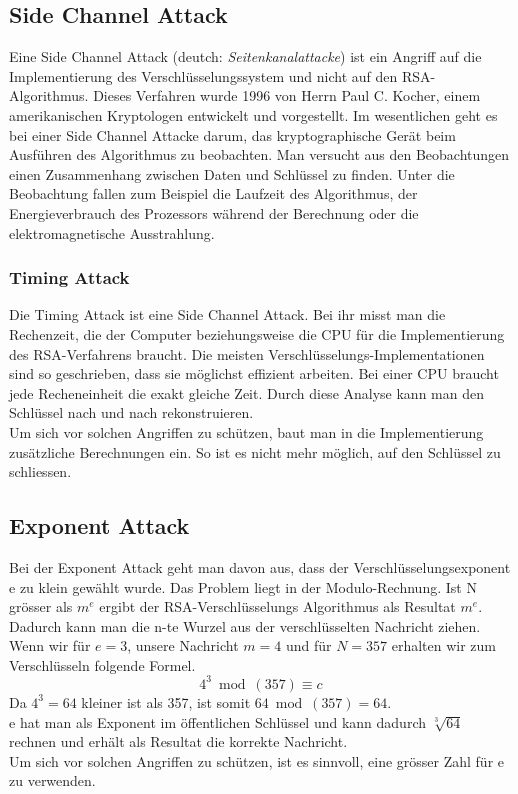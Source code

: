 %
\subsection{Side Channel Attack}
Eine Side Channel Attack (deutch: \textit{Seitenkanalattacke}) ist ein Angriff auf die Implementierung des Verschlüsselungssystem und nicht auf den RSA-Algorithmus. Dieses Verfahren wurde 1996 von Herrn Paul C. Kocher, einem amerikanischen Kryptologen entwickelt und vorgestellt.
Im wesentlichen geht es bei einer Side Channel Attacke darum, das kryptographische Gerät beim Ausführen des Algorithmus zu beobachten.
Man versucht aus den Beobachtungen einen Zusammenhang zwischen Daten und Schlüssel zu finden.
Unter die Beobachtung fallen zum Beispiel die Laufzeit des Algorithmus, der Energieverbrauch des Prozessors während der Berechnung oder die elektromagnetische Ausstrahlung.
%
\subsubsection{Timing Attack}
Die Timing Attack ist eine Side Channel Attack. 
Bei ihr misst man die Rechenzeit, die der Computer beziehungsweise die CPU für die Implementierung des RSA-Verfahrens braucht. Die meisten Verschlüsselungs-Implementationen sind so geschrieben, dass sie möglichst effizient arbeiten. Bei einer CPU braucht jede Recheneinheit die exakt gleiche Zeit. Durch diese Analyse kann man den Schlüssel nach und nach rekonstruieren.\\
%
Um sich vor solchen Angriffen zu schützen, baut man in die Implementierung zusätzliche Berechnungen ein. So ist es nicht mehr möglich, auf den Schlüssel zu schliessen.
%
%
\subsection{Exponent Attack}
Bei der Exponent Attack geht man davon aus, dass der Verschlüsselungsexponent e zu klein gewählt wurde. Das Problem liegt in der Modulo-Rechnung. Ist N grösser als $m^e$ ergibt der RSA-Verschlüsselungs Algorithmus als Resultat $m^e$. Dadurch kann man die n-te Wurzel aus der verschlüsselten Nachricht ziehen. \\
Wenn wir für $e = 3$, unsere Nachricht $m = 4$ und für $N = 357$ erhalten wir zum Verschlüsseln folgende Formel.
\begin{equation*}
  4^3 \bmod(357) \equiv c
\end{equation*}
Da $4^3 = 64$ kleiner ist als 357, ist somit $64 \bmod(357) = 64$.\\
e hat man als Exponent im öffentlichen Schlüssel und kann dadurch $\sqrt[3]{64}$ rechnen und erhält als Resultat die korrekte Nachricht.\\
%
Um sich vor solchen Angriffen zu schützen, ist es sinnvoll, eine grösser Zahl für e zu verwenden.
